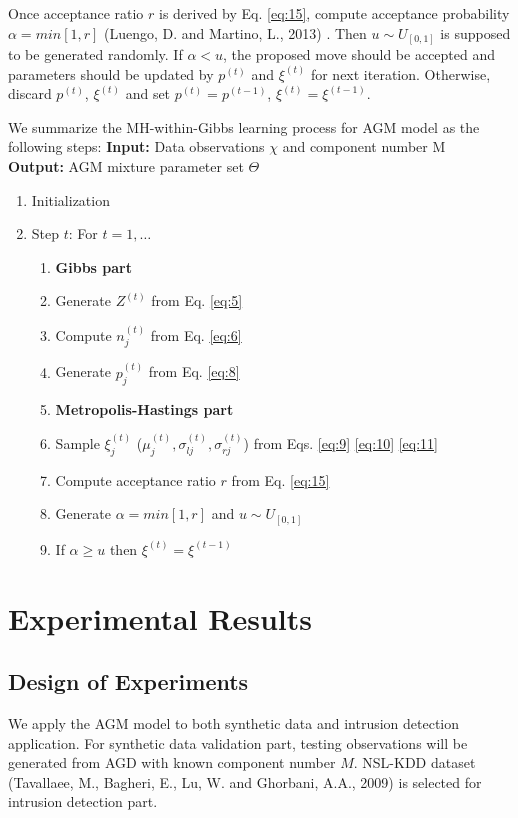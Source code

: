 \documentclass[conference]{llncs}
\begin{document}
Once acceptance ratio $r$ is derived by Eq. \eqref{eq:15}, compute acceptance probability $\alpha = min[1,r]$ (Luengo, D. and Martino, L., 2013) \cite{b9}. Then $u \sim U_{[0,1]}$ is supposed to be generated randomly. If $\alpha < u$, the proposed move should be accepted and parameters should be updated by $p^{(t)}$ and $\xi^{(t)}$ for next iteration. Otherwise, discard $p^{(t)}$, $\xi^{(t)}$ and set $p^{(t)} = p^{(t-1)}$, $\xi^{(t)} = \xi^{(t-1)}$.

We summarize the MH-within-Gibbs learning process for AGM model as the following steps:
\bigbreak
\noindent\textbf{Input:} Data observations $\chi$ and component number M \\
\textbf{Output:} AGM mixture parameter set $\Theta$
\bigbreak

\begin{enumerate}
\item Initialization
\item Step $t$: For $t = 1,\ldots$
\begin{enumerate}
\item[]\textbf{Gibbs part}
\item Generate $Z^{(t)}$ from Eq. \eqref{eq:5}
\item Compute $n_j^{(t)}$ from Eq. \eqref{eq:6}
\item Generate $p_j^{(t)}$ from Eq. \eqref{eq:8}
\item[] \textbf{Metropolis-Hastings part}
\item Sample $\xi_j^{(t)}$ ($\mu_j^{(t)}, \sigma_{lj}^{(t)}, \sigma_{rj}^{(t)}$) from Eqs. \eqref{eq:9} \eqref{eq:10} \eqref{eq:11}
\item Compute acceptance ratio $r$ from Eq. \eqref{eq:15}
\item Generate $\alpha = min[1,r]$ and $u \sim U_{[0,1]}$
\item If $\alpha \geq u$ then $\xi^{(t)} = \xi^{(t-1)}$
\end{enumerate}
\end{enumerate}


\section{Experimental Results}
\subsection{Design of Experiments}
We apply the AGM model to both synthetic data and intrusion detection application. For synthetic data validation part, testing observations will be generated from AGD with known component number $M$. NSL-KDD dataset (Tavallaee, M., Bagheri, E., Lu, W. and Ghorbani, A.A., 2009) \cite{b10} is selected for intrusion detection part.
\end{document}
